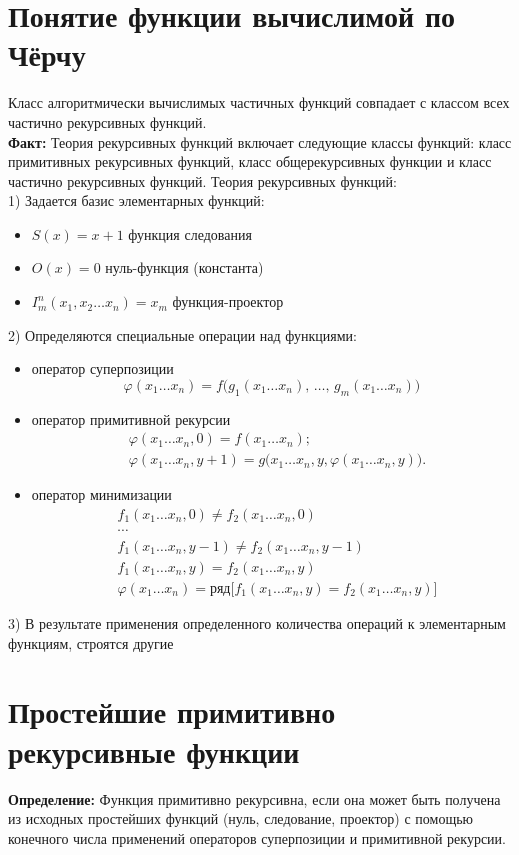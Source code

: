 \documentclass[../main.tex]{subfiles}
\begin{document}
\section{Понятие функции вычислимой по Чёрчу}
Класс алгоритмически вычислимых частичных функций совпадает с классом всех частично рекурсивных функций. \\
\textbf{Факт:
} Теория рекурсивных функций включает следующие классы функций: класс примитивных рекурсивных функций, класс общерекурсивных функции и класс частично рекурсивных функций.
Теория рекурсивных функций:\\
	1) Задается базис элементарных функций:
 \begin{itemize}
	\item $S(x)=x+1$ функция следования
    \item $O(x)=0$ нуль-функция (константа)
    \item $I_m^n(x_1,x_2 \ldots x_n)=x_m$ функция-проектор
 \end{itemize}
	2) Определяются специальные операции над функциями:
 \begin{itemize}
	\item оператор суперпозиции 
	\[\varphi(x_1 \ldots x_n)= f \bigl(g_1(x_1 \ldots x_n),\,\ldots,\, g_m(x_1 \ldots x_n)\bigr)\]
    \item оператор примитивной рекурсии 
    \begin{align*}
		&\varphi(x_1 \ldots x_n,0)= f(x_1 \ldots x_n);\\ 
		&\varphi(x_1 \ldots x_n, y+1) = g \bigl(x_1 \ldots x_n, y, \varphi(x_1 \ldots x_n,y)\bigr). 
	\end{align*}
    \item оператор минимизации
    \begin{align*}
		&f_1(x_1 \ldots x_n, 0) \ne f_2(x_1 \ldots x_n, 0) \\ 
		& \cdots \\
		&f_1(x_1 \ldots x_n, y - 1) \ne f_2(x_1 \ldots x_n, y - 1) \\ 
		&f_1(x_1 \ldots x_n, y) = f_2(x_1 \ldots x_n, y) \\ 
		&\varphi(x_1 \ldots x_n) = \text{ряд} \bigl[ f_1(x_1 \ldots x_n, y) = f_2(x_1 \ldots x_n, y) \bigr]
	\end{align*}
 \end{itemize}
	3) В результате применения определенного количества операций к элементарным функциям, строятся другие

\section{Простейшие примитивно рекурсивные функции}
\textbf{Определение:
} Функция примитивно рекурсивна, если она может быть получена из исходных простейших функций (нуль, следование, проектор) с помощью конечного числа применений операторов суперпозиции и примитивной рекурсии.
\end{document}
